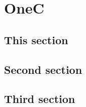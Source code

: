 \documentclass[oneside]{memoir}
\begin{document}
\dominitoc
\tableofcontents*

\chapter[OneA][OneB]{OneC}
\minitoc
\section{This section}
\lipsum[1]
\section{Second section}
\lipsum[2]
\section{Third section}
\lipsum[3]
\end{document}
